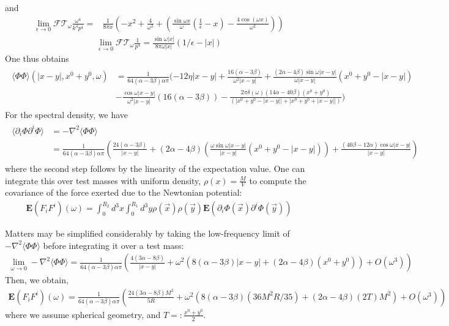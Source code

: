 \documentclass[aps,preprintnumbers,superscriptaddress,longbibliography]{revtex4-1}
\begin{document}
and 
\begin{align}
\lim_{\epsilon\rightarrow0}\mathcal{FT}_{\omega}\frac{\omega^4}{k^4p^4}=&\frac{1}{8\pi x}(-x^2+\frac{4}{\omega^2}+(\frac{\sin{\omega x}}{\omega}(\frac{1}{\epsilon}-x)-\frac{4\cos(\omega x)}{\omega^2}))
\end{align}
\begin{align}
    \lim_{\epsilon\rightarrow0}\mathcal{FT}_{\omega}\frac{1}{p^4}=\frac{\sin{\omega|x|}}{8\pi\omega|x|}(1/\epsilon-|x|)
    \end{align}One thus obtains
\begin{align}
\label{eq:2pointNewton}
\begin{split}
    \langle \Phi \Phi\rangle(|x-y|,x^0+y^0,\omega)&=\frac{1}{64(\alpha-3\beta)\alpha\pi}(-12\eta|x-y|+\frac{16(\alpha-3\beta)}{\omega^2|x-y|} +\frac{(2\alpha-  4\beta)\sin{\omega |x-y|}}{\omega|x-y|}(x^0+y^0-|x-y|)\\&-\frac{\cos{\omega |x-y|}}{\omega^2|x-y|}(16(\alpha-3\beta))-\frac{2\pi\delta(\omega)(14\alpha-40\beta)(x^0+y^0)}{(|x^0+y^0-|x-y||+|x^0+y^0+|x-y||)})
    \end{split}
\end{align}
For the spectral density, we have 
\begin{align}
\label{eq:2pointNewtonPSD}
\begin{split}
  \langle\partial_i \Phi \partial^i\Phi\rangle&=-\nabla^2\langle \Phi \Phi\rangle \\&=\frac{1}{64(\alpha-3\beta)\alpha\pi}(\frac{24(\alpha-3\beta)}{|x-y|}+(2\alpha-4\beta)(\frac{\omega\sin{\omega|x-y|}}{|x-y|}(x^0+y^0-|x-y|))+\frac{(40\beta-12\alpha)\cos{\omega |x-y|}}{|x-y|})
\end{split}
\end{align}where the second step follows by the linearity of the expectation value. 
One can integrate this over test masses with uniform density, $\rho(x)=\frac{M}{V}$ to compute the covariance of the force exerted due to the Newtonian potential:
\begin{align}
\boldsymbol{E}(F_iF^i)(\omega)=    \int_0^{R_2} d^3x\int_0^{R_1}d^3y\rho(\vec{x})\rho(\vec{y})\boldsymbol{E} (\partial_i \Phi(\vec{x}) \partial^i\Phi(\vec{y}))
\end{align}

Matters may be simplified considerably by taking the low-frequency limit of $-\nabla^2\langle \Phi\Phi\rangle$ before integrating it over a test mass:
\begin{align}
    \lim_{\omega\rightarrow0}-\nabla^2\langle \Phi \Phi\rangle=\frac{1}{64(\alpha-3\beta)\alpha\pi}(\frac{4(3\alpha-8\beta)}{|x-y|}+ \omega^2(8(\alpha-3\beta)|x-y|+(2\alpha-4\beta)(x^0+y^0))+O(\omega^3))
\end{align}
Then, we obtain,
\begin{align}
    \boldsymbol{E}(F_iF^i)(\omega)=\frac{1}{64(\alpha-3\beta)\alpha\pi}(\frac{24(3\alpha-8\beta)M^2}{5R}+ \omega^2(8(\alpha-3\beta)(36M^2R/35)+(2\alpha-4\beta)(2T)M^2)+O(\omega^3))
\end{align}
where we assume spherical geometry, and $T=:\frac{x^0+y^0}{2}$. 
\end{document}
